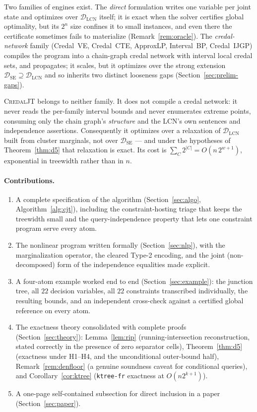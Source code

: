 \documentclass[11pt]{article}
\theoremstyle{definition}
\newcommand{\DSE}{\mathcal{D}_{\mathrm{SE}}}
\newcommand{\DLCN}{\mathcal{D}_{\mathrm{LCN}}}
\begin{document}
Two families of engines exist. The \emph{direct} formulation writes one variable
per joint state and optimizes over $\DLCN$ itself; it is exact when the solver
certifies global optimality, but its $2^n$ size confines it to small instances,
and even there the certificate sometimes fails to materialize
(Remark~\ref{rem:oracle}). The
\emph{credal-network} family (Credal~VE, Credal~CTE, ApproxLP, Interval~BP,
Credal~IJGP) compiles the program into a chain-graph credal network with interval
local credal sets, and propagates; it scales, but it optimizes over the strong
extension $\DSE\supseteq\DLCN$ and so inherits two distinct looseness gaps
(Section~\ref{sec:prelim-gaps}).

\textsc{CredalJT} belongs to neither family. It does not compile a credal
network: it never reads the per-family interval bounds and never enumerates
extreme points, consuming only the chain graph's \emph{structure} and the LCN's
own sentences and independence assertions. Consequently it optimizes over a
relaxation of $\DLCN$ built from cluster marginals, not over $\DSE$ --- and
under the hypotheses of Theorem~\ref{thm:d5} that relaxation is exact. Its cost
is $\sum_C 2^{|C|}=O(n\,2^{w+1})$, exponential in treewidth rather than in $n$.

\paragraph{Contributions.}
\begin{enumerate}
  \item A complete specification of the algorithm (Section~\ref{sec:algo},
    Algorithm~\ref{alg:cjt}), including the constraint-hosting triage that keeps
    the treewidth small and the query-independence property that lets one
    constraint program serve every atom.
  \item The nonlinear program written formally (Section~\ref{sec:nlp}), with the
    marginalization operator, the cleared Type-2 encoding, and the joint
    (non-decomposed) form of the independence equalities made explicit.
  \item A four-atom example worked end to end (Section~\ref{sec:example}): the
    junction tree, all $22$ decision variables, all $22$ constraints
    transcribed individually, the resulting bounds, and an independent
    cross-check against a certified global reference on every atom.
  \item The exactness theory consolidated with complete proofs
    (Section~\ref{sec:theory}): Lemma~\ref{lem:rip} (running-intersection
    reconstruction, stated correctly in the presence of zero separator cells),
    Theorem~\ref{thm:d5} (exactness under H1--H4, and the unconditional
    outer-bound half), Remark~\ref{rem:denfloor} (a genuine soundness caveat for
    conditional queries), and Corollary~\ref{cor:ktree} (\texttt{ktree-fr}
    exactness at $O(n2^{k+1})$).
  \item A one-page self-contained subsection for direct inclusion in a paper
    (Section~\ref{sec:paper}).
\end{enumerate}
\end{document}
